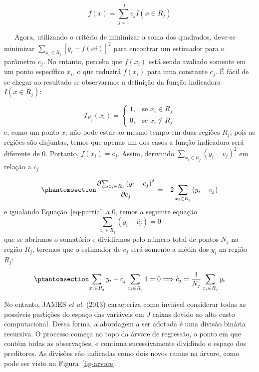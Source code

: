 \documentclass[
  12pt,
  letterpaper,
  DIV=11,
  numbers=noendperiod]{scrreprt}
\begin{document}
\[
f\left(x\right) = \sum^J_{j=1}c_j I\left(x \in R_j \right)
\]

\vspace{12pt}

~~~Agora, utilizando o critério de minimizar a soma dos quadrados,
deve-se minimizar
\(\sum_{x_i \in R_j} \left[y_i - f\left(xi\right)\right]^2\) para
encontrar um estimador para o parâmetro \(c_j\). No entanto, perceba que
\(f\left(x_i\right)\) está sendo avaliado somente em um ponto específico
\(x_i\), o que reduzirá \(f\left(x_i\right)\) para uma constante
\(c_j\). É fácil de se chegar ao resultado se observarmos a definição da
função indicadora \(I\left(x \in R_j \right)\):

\[
I_{R_j}(x_i) =
\begin{cases}
    1,& \text{se } x_i \in R_j \\
    0,& \text{se } x_i \notin R_j
\end{cases}
\] e, como um ponto \(x_i\) não pode estar ao mesmo tempo em duas
regiões \(R_j\), pois as regiões são disjuntas, temos que apenas um dos
casos a função indicadora será diferente de 0. Portanto,
\(f\left(x_i\right) = c_j\). Assim, derivando
\(\sum_{x_i \in R_j} \left(y_i - c_j\right)^2\) em relação a \(c_j\)

\begin{equation}\phantomsection\label{eq-partial}{
\frac{\partial{\sum_{x_i \in R_j} \left(y_i - c_j\right)^2}}{\partial{c_j}} = -2\sum_{x_i \in R_j} \left(y_i - c_j\right)
}\end{equation} e igualando Equação~\ref{eq-partial} a 0, temos a
seguinte equação \[
\sum_{x_i \in R_j} \left(y_i - \hat{c}_j\right) = 0
\] que se abrirmos o somatório e dividirmos pelo número total de pontos
\(N_{j}\) na região \(R_j\), teremos que o estimador de \(c_j\) será
somente a média dos \(y_i\) na região \(R_j\):

\begin{equation}\phantomsection\label{eq-estimacj}{
\sum_{x_i \in R_j} y_i - c_j \sum_{x_i \in R_j} 1 = 0 \Longrightarrow \hat{c}_j = \frac{1}{N_{j}}\sum_{x_i \in R_j} y_i
}\end{equation}

\vspace{12pt}

No entanto, JAMES \emph{et al.} (2013) caracteriza como inviável
considerar todas as possíveis partições do espaço das variáveis em \(J\)
caixas devido ao alto custo computacional. Dessa forma, a abordagem a
ser adotada é uma divisão binária recursiva. O processo começa no topo
da árvore de regressão, o ponto em que contém todas as observações, e
continua sucessivamente dividindo o espaço dos preditores. As divisões
são indicadas como dois novos ramos na árvore, como pode ser visto na
Figura~\ref{fig-arvore}.
\end{document}
